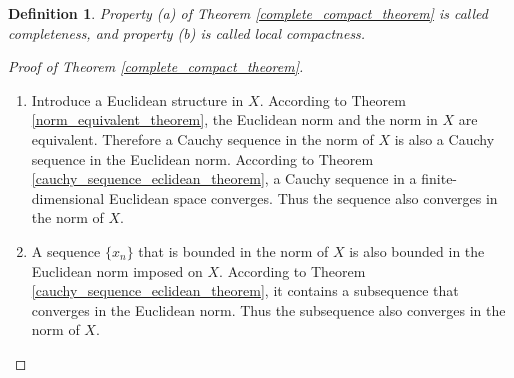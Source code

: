\documentclass[11pt]{book}
\newtheorem{definition}{Definition}[chapter]
\theoremstyle{definition}
\numberwithin{equation}{chapter}
\begin{document}
\begin{definition}
Property (a) of Theorem \ref{complete_compact_theorem} is called completeness, and property (b) is called local compactness.
\end{definition}

\medskip

\begin{proof}[Proof of Theorem \ref{complete_compact_theorem}]
~\begin{enumerate}[label=(\alph*)]
    \item Introduce a Euclidean structure in $X$. According to Theorem \ref{norm_equivalent_theorem}, the Euclidean norm and the norm in $X$ are equivalent. Therefore a Cauchy sequence in the norm of $X$ is also a Cauchy sequence in the Euclidean norm.  According to Theorem \ref{cauchy_sequence_eclidean_theorem}, a Cauchy sequence in a finite-dimensional Euclidean space converges. Thus the sequence also converges in the norm of $X$.
    
    \item A sequence $\{x_n\}$ that is bounded in the norm of $X$ is also bounded in the Euclidean norm imposed on $X$. According to Theorem \ref{cauchy_sequence_eclidean_theorem}, it contains a subsequence that converges in the Euclidean norm. Thus the subsequence also converges in the norm of $X$.
\end{enumerate}
\end{proof}

\medskip
\end{document}
